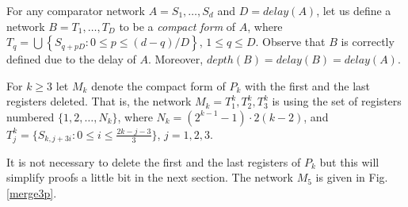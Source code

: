 \documentclass{llncs}
\newcommand{\braced}[1]{{\left\{#1\right\}}}
\begin{document}
For any comparator network $A=S_1,\ldots,S_d$ and
$D = delay(A)$, let us define a network $B=T_1,\ldots,T_D$ to be a {\em 
compact form} of $A$, where $T_q=\bigcup\braced{S_{q+pD}: 0\le p\le(d-q)/D}$, 
$1\le q\le D$. Observe that $B$ is correctly defined due to the delay
of $A$.  Moreover, $depth(B)=delay(B)=delay(A)$.

\begin{definition}
For $k\ge 3$ let $M_k$ denote the compact form of $P_k$ with the first
and the last registers deleted. That is, the network $M_k=T^k_1,T^k_2,T^k_3$ 
is using the set of registers numbered $\{1,2, \ldots, N_k\}$, where 
$N_k=(2^{k-1}-1)\cdot 2(k-2)$, and $T^k_j=\{S_{k,j+3i}: 0\le 
i\le\frac{2k-j-3}{3}\}$, $j=1,2,3$.
\end{definition}
It is not necessary to delete the first and the last registers of $P_k$ but 
this will simplify proofs a little bit in the next section. The network $M_5$ 
is given in Fig. \ref{merge3p}.
\end{document}
